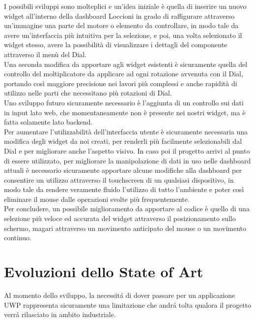 I possibili sviluppi sono molteplici e un’idea iniziale è quella di inserire un nuovo widget all’interno della dashboard Loccioni in grado di raffigurare attraverso un’immagine una parte del motore o elemento da controllare, in modo tale da avere un’interfaccia più intuitiva per la selezione, e poi, una volta selezionato il widget stesso, avere la possibilità di visualizzare i dettagli del componente attraverso il menù del Dial.\\
Una seconda modifica da apportare agli widget esistenti è sicuramente quella del controllo del moltiplicatore da applicare ad ogni rotazione avvenuta con il Dial, portando così maggiore precisione nei lavori più complessi e anche rapidità di utilizzo nelle parti che necessitano più rotazioni di Dial.\\
Uno sviluppo futuro sicuramente necessario è l’aggiunta di un controllo sui dati in input lato web, che momentaneamente non è presente nei nostri widget, ma è fatta solamente lato backend.\\
Per aumentare l’utilizzabilità dell’interfaccia utente è sicuramente necessaria una modifica degli widget da noi creati, per renderli più facilmente selezionabili dal Dial e per migliorare anche l’aspetto visivo.
In caso poi il progetto arrivi al punto di essere utilizzato, per migliorare la manipolazione di dati in uso nelle dashboard attuali è necessario sicuramente apportare alcune modifiche alla dashboard per consentire un utilizzo attraverso il touchscreen di un qualsiasi dispositivo, in modo tale da rendere veramente fluido l’utilizzo di tutto l’ambiente e poter così eliminare il mouse dalle operazioni svolte più frequentemente.\\
Per concludere, un possibile miglioramento da apportare al codice è quello di una selezione più veloce ed accurata del widget attraverso il posizionamento sullo schermo, magari attraverso un movimento anticipato del mouse o un movimento continuo.





\section{Evoluzioni dello State of Art}


Al momento dello sviluppo, la necessitá di dover passare per un applicazione UWP rappresenta sicuramente una limitazione che andrá tolta qualora il progetto verrá rilasciato in ambito industriale.\\

